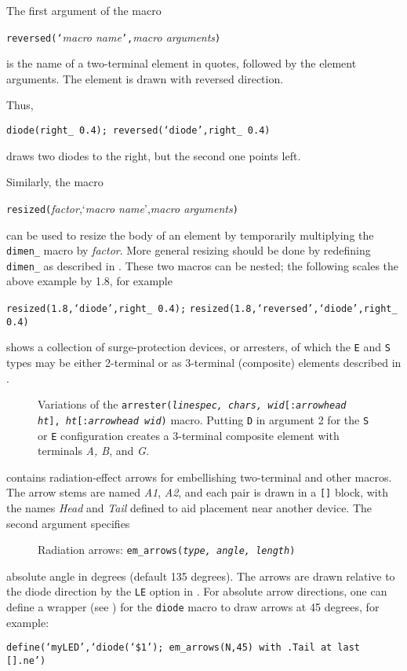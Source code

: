 The first argument of the macro
\par
{\tt reversed(`}{\sl macro name}{\tt',}{\sl macro arguments}{\tt )}
\par
\noindent
is the name of a two-terminal element in quotes, followed by the
element arguments.  The element is drawn with reversed direction.

\pagebreak
Thus,
\par
{\tt diode(right\_ 0.4); reversed(`diode',right\_ 0.4)}
\par
\noindent
draws two diodes to the right, but the second one points left.

Similarly, the macro
\par
{\tt resized(}{\sl factor},`{\sl macro name}',{\sl macro arguments}{\tt )}
\par
\noindent
can be used to resize the body of an element by temporarily multiplying
the {\tt dimen\_} macro by {\sl factor}. More general resizing should be
done by redefining {\tt dimen\_} as described in .
These two macros can be nested; the following scales the above example
by 1.8, for example
\par
{\tt resized(1.8,`diode',right\_ 0.4);}
{\tt resized(1.8,`reversed',`diode',right\_ 0.4)}

\pagebreak
{} shows a collection of surge-protection devices, or arresters,
of which the {\tt E} and {\tt S} types may be either 2-terminal or as
3-terminal (composite) elements described in .
\begin{figure}[ht]
   
   \caption{Variations of the {\tt arrester({\sl linespec, chars,}
     {\sl wid}[{\tt :}{\sl arrowhead ht}], {\sl ht}[{\tt :}{\sl arrowhead wid})}
     macro. Putting {\tt D} in argument 2 for the {\tt S} or {\tt E}
     configuration creates a 3-terminal composite element
     with terminals {\sl A, B}, and {\sl G.}}
   \label{Arresters}
   \end{figure}

 contains radiation-effect arrows for embellishing two-terminal
and other macros.
The arrow stems are named {\sl A1}, {\sl A2},
and each pair is drawn in a \verb|[]| block, with
the names {\sl Head} and {\sl Tail} defined to
aid placement near another device.  The second argument specifies
\begin{figure}[ht]
   
   \caption{Radiation arrows: {\tt em\_arrows({\sl type, angle, length})}}
   \label{Emarrows}
   \end{figure}
absolute angle in degrees (default 135 degrees).
The arrows are drawn relative to the diode direction by the {\tt LE}
option in .  For absolute arrow directions, one can
define a wrapper (see ) for the {\tt diode} macro to draw arrows
at 45 degrees, for example:
\par
{\tt define(`myLED',`diode(`\$1'); em\_arrows(N,45)
 with .Tail at last [].ne')}

